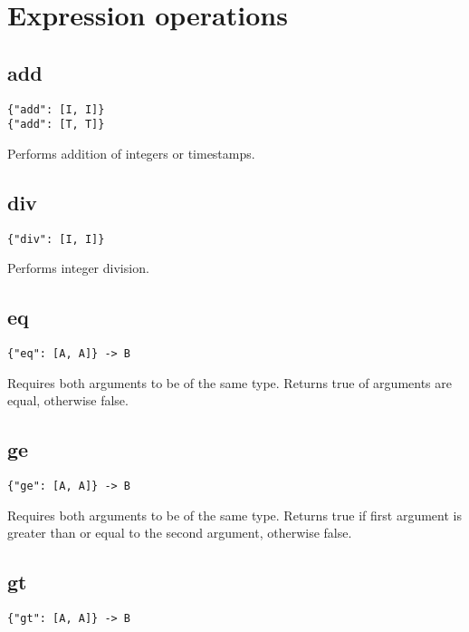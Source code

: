 \documentclass[a4paper]{article}
\begin{document}
\section{Expression operations}

\subsection{add}

\begin{verbatim}
{"add": [I, I]}
{"add": [T, T]}
\end{verbatim}

Performs addition of integers or timestamps.

\subsection{div}

\begin{verbatim}
{"div": [I, I]}
\end{verbatim}

Performs integer division.

\subsection{eq}

\begin{verbatim}
{"eq": [A, A]} -> B
\end{verbatim}

Requires both arguments to be of the same type. Returns true of
arguments are equal, otherwise false.

\subsection{ge}

\begin{verbatim}
{"ge": [A, A]} -> B
\end{verbatim}

Requires both arguments to be of the same type. Returns true if first
argument is greater than or equal to the second argument, otherwise
false.

\subsection{gt}

\begin{verbatim}
{"gt": [A, A]} -> B
\end{verbatim}
\end{document}
